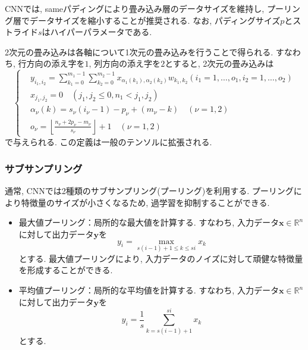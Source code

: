 \documentclass[uplatex]{jsarticle}
\theoremstyle{definition}
\numberwithin{equation}{section}
\newcommand{\R}{\mathbb{R}}
\begin{document}
CNNでは, sameパディングにより畳み込み層のデータサイズを維持し, プーリング層でデータサイズを縮小することが推奨される.
なお, パディングサイズ$p$とストライド$s$はハイパーパラメータである.

2次元の畳み込みは各軸について1次元の畳み込みを行うことで得られる.
すなわち, 行方向の添え字を$1$, 列方向の添え字を$2$とすると, 2次元の畳み込みは
\begin{equation}
    \left\{
    \begin{aligned}
        &y_{i_{1}, i_{2}} = \sum_{k_{1} = 0}^{m_{1} - 1} \sum_{k_{2} = 0}^{m_{2} - 1} x_{\alpha_{1}(k_{1}), \alpha_{2}(k_{2})}w_{k_{1}, k_{2}} (i_{1} = 1, \dots, o_{1}, i_{2} = 1, \dots, o_{2}) \\
        &x_{j_{1}, j_{2}} = 0 \quad (j_{1}, j_{2} \leq 0, n_{1} < j_{1}, j_{2}) \\
        &\alpha_{\nu}(k) = s_{\nu}(i_{\nu} - 1) - p_{\nu} + (m_{\nu} - k) \quad (\nu = 1, 2) \\
        &o_{\nu} = \left\lfloor\frac{n_{\nu} + 2p_{\nu} - m_{\nu}}{s_{\nu}}\right\rfloor + 1 \quad (\nu = 1, 2)
    \end{aligned}
    \right.
\end{equation}
で与えられる.
この定義は一般のテンソルに拡張される.

\subsubsection{サブサンプリング}
通常, CNNでは2種類のサブサンプリング(プーリング)を利用する.
プーリングにより特徴量のサイズが小さくなるため, 過学習を抑制することができる.
\begin{itemize}
    \item
    最大値プーリング：局所的な最大値を計算する.
    すなわち, 入力データ$\bm{x} \in \R^{n}$に対して出力データ$\bm{y}$を
    \begin{equation}
        y_{i} = \max_{s(i - 1) + 1 \leq k \leq si} x_{k}
    \end{equation}
    とする.
    最大値プーリングにより, 入力データのノイズに対して頑健な特徴量を形成することができる.

    \item
    平均値プーリング：局所的な平均値を計算する.
    すなわち, 入力データ$\bm{x} \in \R^{n}$に対して出力データ$\bm{y}$を
    \begin{equation}
        y_{i} = \frac{1}{s}\sum_{k = s(i - 1) + 1}^{si} x_{k}
    \end{equation}
    とする.
\end{itemize}
\end{document}
